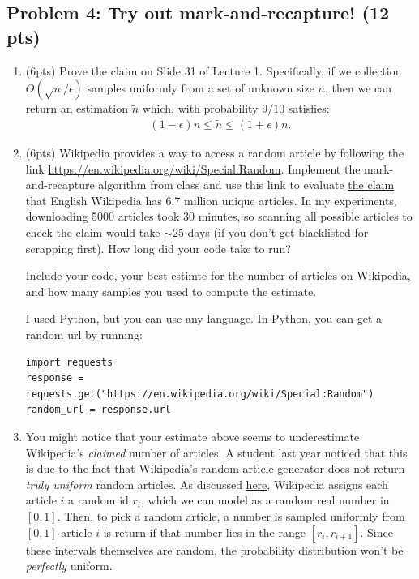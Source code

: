\documentclass[10pt]{article}
\begin{document}
\subsection{Problem 4: Try out mark-and-recapture! (12 pts)}
\begin{enumerate}
	\item (6pts) Prove the claim on Slide 31 of Lecture 1. Specifically, if we collection $O(\sqrt{n}/\epsilon)$ samples uniformly from a set of unknown size $n$, then we can return an estimation $\tilde{n}$ which, with probability $9/10$ satisfies:
	\begin{align*}
		(1-\epsilon)n \leq \tilde{n} \leq (1+\epsilon)n.
	\end{align*}
	
	\item (6pts) Wikipedia provides a way to access a random article by following the link \url{https://en.wikipedia.org/wiki/Special:Random}. Implement the mark-and-recapture algorithm from class and use this link to evaluate \href{https://en.wikipedia.org/wiki/English_Wikipedia}{the claim} that English Wikipedia has 6.7 million unique articles. In my experiments, downloading 5000 articles took 30 minutes, so scanning all possible articles to check the claim would take $\sim 25$ days (if you don't get blacklisted for scrapping first). How long did your code take to run?
	
	Include your code, your best estimte for the number of articles on Wikipedia, and how many samples you used to compute the estimate. 
	
	 I  used Python, but you can use any language. In Python, you can get a random url by running:
\begin{verbatim}
import requests
response = requests.get("https://en.wikipedia.org/wiki/Special:Random")
random_url = response.url	
\end{verbatim}

\item You might notice that your estimate above seems to underestimate Wikipedia's \emph{claimed} number of articles. A student last year noticed that this is due to the fact that 
Wikipedia's random article generator does not return \emph{truly uniform} random articles. As discussed \href{https://en.wikipedia.org/wiki/Wikipedia:FAQ/Technical#random}{here}, Wikipedia assigns each article $i$ a random id $r_i$, which we can model as a random real number in $[0, 1]$. Then, to pick a random article, a number is sampled uniformly from $[0, 1]$ article $i$ is return if that number lies in the range $[r_i, r_{i+1}]$. Since these intervals themselves are random, the probability distribution won't be \emph{perfectly} uniform.\\


\end{enumerate}
\end{document}
